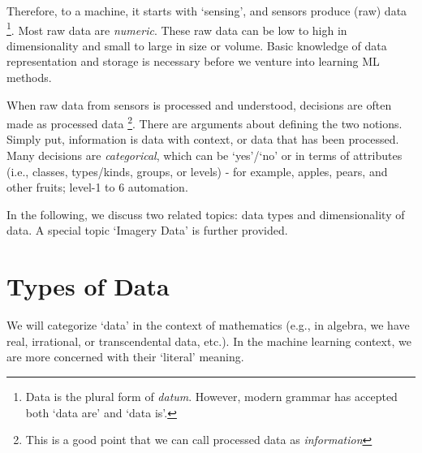 \documentclass[12pt]{article}
\begin{document}
Therefore, to a machine, it starts with `sensing', and sensors produce (raw) data \footnote{Data is the plural form of \textit{datum}. However, modern grammar has accepted both `data are' and `data is'. }. Most raw data are \textit{numeric}. These raw data can be low to high in dimensionality and small to large in size or volume. Basic knowledge of data representation and storage is necessary before we venture into learning ML methods.

When raw data from sensors is processed and understood, decisions are often made as processed data \footnote{This is a good point that we can call processed data as \textit{information}}. There are arguments about defining the two notions. Simply put, information is data with context, or data that has been processed. Many decisions are \textit{categorical}, which can be `yes'/`no' or in terms of attributes (i.e., classes, types/kinds, groups, or levels) - for example, apples, pears, and other fruits; level-1 to 6 automation. 

In the following, we discuss two related topics: data types and dimensionality of data. A special topic `Imagery Data' is further provided.  

\section{Types of Data}
We will categorize `data' in the context of mathematics (e.g., in algebra, we have real, irrational, or transcendental data, etc.). In the machine learning context, we are more concerned with their `literal' meaning. 
\end{document}
